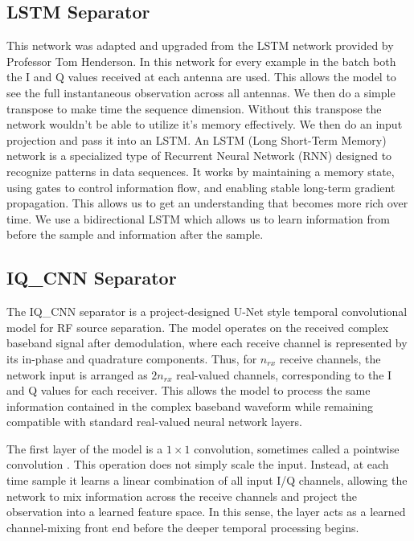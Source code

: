 \documentclass[conference]{IEEEtran}
\begin{document}
\subsection{LSTM Separator}
This network was adapted and upgraded from the LSTM network provided by Professor Tom Henderson. In this network for every example in the batch both the I and Q values received at each antenna are used. This allows the model to see the full instantaneous observation across all antennas. We then do a simple transpose to make time the sequence dimension. Without this transpose the network wouldn't be able to utilize it's memory effectively. We then do an input projection and pass it into an LSTM. An LSTM (Long Short-Term Memory) network is a specialized type of Recurrent Neural Network (RNN) designed to recognize patterns in data sequences. It works by maintaining a memory state, using gates to control information flow, and enabling stable long-term gradient propagation. This allows us to get an understanding that becomes more rich over time. We use a bidirectional LSTM which allows us to learn information from before the sample and information after the sample.

\subsection{IQ\_CNN Separator}
The IQ\_CNN separator is a project-designed U-Net style temporal convolutional model for RF source separation. The model operates on the received complex baseband signal after demodulation, where each receive channel is represented by its in-phase and quadrature components. Thus, for $n_{rx}$ receive channels, the network input is arranged as $2n_{rx}$ real-valued channels, corresponding to the I and Q values for each receiver. This allows the model to process the same information contained in the complex baseband waveform while remaining compatible with standard real-valued neural network layers.

The first layer of the model is a $1 \times 1$ convolution, sometimes called a pointwise convolution \cite{lin2013nin}. This operation does not simply scale the input. Instead, at each time sample it learns a linear combination of all input I/Q channels, allowing the network to mix information across the receive channels and project the observation into a learned feature space. In this sense, the layer acts as a learned channel-mixing front end before the deeper temporal processing begins.
\end{document}
